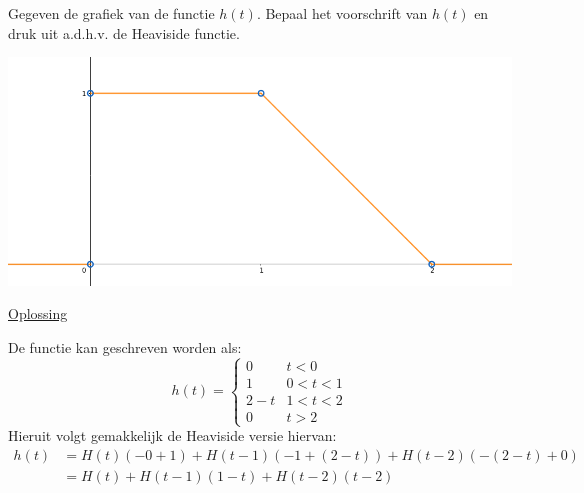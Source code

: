 \documentclass[12pt]{report}
\newcommand{\exercise}[2]{
  #1
  

  \underline{Oplossing}
  
  #2
  
  \hrulefill
}
\begin{document}
\exercise{Gegeven de grafiek van de functie $h(t)$. Bepaal het voorschrift van $h(t)$ en druk uit a.d.h.v. de Heaviside functie.
\begin{center}
 \includegraphics[width=\textwidth]{oef3_heaviside}
\end{center}}{
De functie kan geschreven worden als:
$$h(t) = \begin{cases}
          0 & t < 0 \\
          1 & 0 < t < 1 \\
          2 - t & 1 < t < 2 \\
          0 & t > 2
         \end{cases}
$$
Hieruit volgt gemakkelijk de Heaviside versie hiervan:
\begin{equation*}
 \begin{split}
  h(t) & = H(t)(-0 + 1) + H(t - 1)(-1 + (2 - t)) + H(t-2)(-(2-t) + 0) \\
       & = H(t) + H(t-1)(1 - t) + H(t- 2)(t - 2)
 \end{split}
\end{equation*}


}
         
\end{document}
